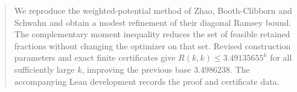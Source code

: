 \begin{abstract}
We reproduce the weighted-potential method of Zhao, Booth-Clibborn and
Schwahn and obtain a modest refinement of their diagonal Ramsey bound.
The complementary moment inequality reduces the set of feasible
retained fractions without changing the optimizer on that set.
Revised construction parameters and exact finite certificates
give $R(k,k)\le3.49135655^k$ for all sufficiently large $k$, improving
the previous base $3.4986238$. The accompanying Lean development records
the proof and certificate data.
\end{abstract}
